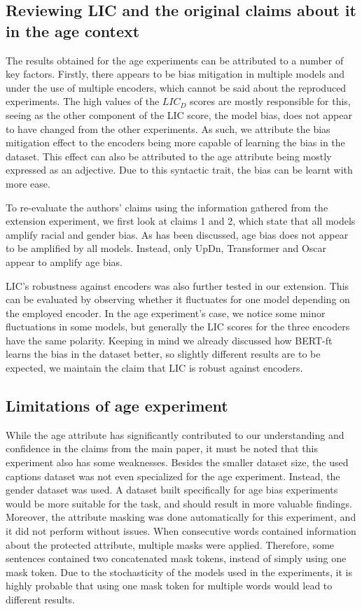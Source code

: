 \subsection{Reviewing LIC and the original claims about it in the age context} %
The results obtained for the age experiments can be attributed to a number of key factors. Firstly, there appears to be bias mitigation in multiple models and under the use of multiple encoders, which cannot be said about the reproduced experiments. The high values of the $LIC_D$ scores are mostly responsible for this, seeing as the other component of the LIC score, the model bias, does not appear to have changed from the other experiments. As such, we attribute the bias mitigation effect to the encoders being more capable of learning the bias in the dataset. This effect can also be attributed to the age attribute being mostly expressed as an adjective. Due to this syntactic trait, the bias can be learnt with more ease.

To re-evaluate the authors' claims using the information gathered from the extension experiment, we first look at claims 1 and 2, which state that all models amplify racial and gender bias. As has been discussed, age bias does not appear to be amplified by all models. 
Instead, only UpDn, Transformer and Oscar appear to amplify age bias.

LIC's robustness against encoders was also further tested in our extension. This can be evaluated by observing whether it fluctuates for one model depending on the employed encoder. In the age experiment's case, we notice some minor fluctuations in some models, but generally the LIC scores for the three encoders have the same polarity. Keeping in mind we already discussed how  BERT-ft learns the bias in the dataset better, so slightly different results are to be expected, we maintain the claim that LIC is robust against encoders. 

\subsection{Limitations of age experiment}
While the age attribute has significantly contributed to our understanding and confidence in the claims from the main paper, it must be noted that this experiment also has some weaknesses. Besides the smaller dataset size, the used captions dataset was not even specialized for the age experiment. Instead, the gender dataset was used. A dataset built specifically for age bias experiments would be more suitable for the task, and should result in more valuable findings. Moreover, the attribute masking was done automatically for this experiment, and it did not perform without issues. When consecutive words contained information about the protected attribute, multiple masks were applied. Therefore, some sentences contained two concatenated mask tokens, instead of simply using one mask token. Due to the stochasticity of the models used in the experiments, it is highly probable that using one mask token for multiple words would lead to different results. 

